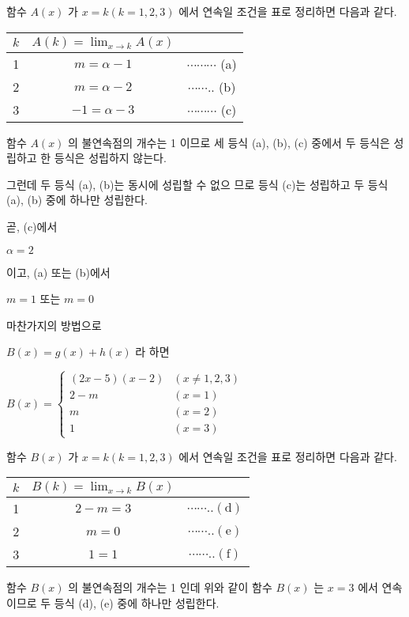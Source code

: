 \documentclass[10pt]{article}
\begin{document}
함수 $A(x)$ 가 $x=k(k=1,2,3)$ 에서 연속일 조건을 표로 정리하면 다음과 같다.

\begin{center}
\begin{tabular}{|c|c|c|}
\hline
$k$ & $A(k)=\lim _{x \rightarrow k} A(x)$ &  \\
\hline
1 & $m=\alpha-1$ & $\cdots \cdots \cdots$ (a) \\
\hline
2 & $m=\alpha-2$ & $\cdots \cdots .$. (b) \\
\hline
3 & $-1=\alpha-3$ & $\cdots \cdots \cdots$ (c) \\
\hline
\end{tabular}
\end{center}

함수 $A(x)$ 의 불연속점의 개수는 1 이므로 세 등식 (a), (b), (c) 중에서 두 등식은 성립하고 한 등식은 성립하지 않는다.

그런데 두 등식 (a), (b)는 동시에 성립할 수 없으 므로 등식 (c)는 성립하고 두 등식 (a), (b) 중에 하나만 성립한다.

곧, (c)에서

$\alpha=2$

이고, (a) 또는 (b)에서

$m=1$ 또는 $m=0$

마찬가지의 방법으로

$B(x)=g(x)+h(x)$ 라 하면

$B(x)= \begin{cases}(2 x-5)(x-2) & (x \neq 1,2,3) \\ 2-m & (x=1) \\ m & (x=2) \\ 1 & (x=3)\end{cases}$

함수 $B(x)$ 가 $x=k(k=1,2,3)$ 에서 연속일 조건을 표로 정리하면 다음과 같다.

\begin{center}
\begin{tabular}{|c|c|c|}
\hline
$k$ & $B(k)=\lim _{x \rightarrow k} B(x)$ &  \\
\hline
1 & $2-m=3$ & $\cdots \cdots . .(\mathrm{d})$ \\
\hline
2 & $m=0$ & $\cdots \cdots . .(\mathrm{e})$ \\
\hline
3 & $1=1$ & $\cdots \cdots . .(\mathrm{f})$ \\
\hline
\end{tabular}
\end{center}

함수 $B(x)$ 의 불연속점의 개수는 1 인데 위와 같이 함수 $B(x)$ 는 $x=3$ 에서 연속이므로 두 등식 (d), (e) 중에 하나만 성립한다.
\end{document}
